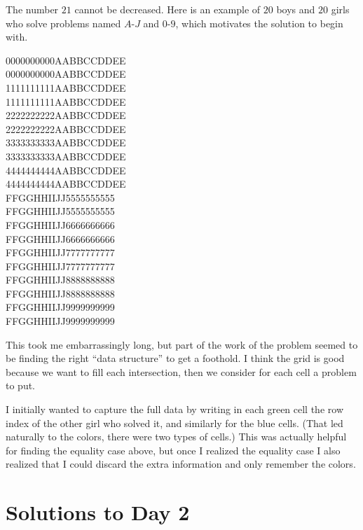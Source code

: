 \begin{remark*}
The number $21$ cannot be decreased.
Here is an example of $20$ boys and $20$ girls
who solve problems named $A$-$J$
and $0$-$9$, which motivates the solution to begin with.
\begin{center}
\scriptsize \ttfamily
{\color{green}0000000000}{\color{blue}AABBCCDDEE} \\
{\color{green}0000000000}{\color{blue}AABBCCDDEE} \\
{\color{green}1111111111}{\color{blue}AABBCCDDEE} \\
{\color{green}1111111111}{\color{blue}AABBCCDDEE} \\
{\color{green}2222222222}{\color{blue}AABBCCDDEE} \\
{\color{green}2222222222}{\color{blue}AABBCCDDEE} \\
{\color{green}3333333333}{\color{blue}AABBCCDDEE} \\
{\color{green}3333333333}{\color{blue}AABBCCDDEE} \\
{\color{green}4444444444}{\color{blue}AABBCCDDEE} \\
{\color{green}4444444444}{\color{blue}AABBCCDDEE} \\
{\color{blue}FFGGHHIIJJ}{\color{green}5555555555} \\
{\color{blue}FFGGHHIIJJ}{\color{green}5555555555} \\
{\color{blue}FFGGHHIIJJ}{\color{green}6666666666} \\
{\color{blue}FFGGHHIIJJ}{\color{green}6666666666} \\
{\color{blue}FFGGHHIIJJ}{\color{green}7777777777} \\
{\color{blue}FFGGHHIIJJ}{\color{green}7777777777} \\
{\color{blue}FFGGHHIIJJ}{\color{green}8888888888} \\
{\color{blue}FFGGHHIIJJ}{\color{green}8888888888} \\
{\color{blue}FFGGHHIIJJ}{\color{green}9999999999} \\
{\color{blue}FFGGHHIIJJ}{\color{green}9999999999}
\end{center}
\end{remark*}

\begin{remark*}
  This took me embarrassingly long,
  but part of the work of the problem seemed to be
  finding the right ``data structure'' to get a foothold.
  I think the grid is good because we want to fill each intersection,
  then we consider for each cell a problem to put.

  I initially wanted to capture the full data by writing
  in each green cell the row index of the other girl who solved it,
  and similarly for the blue cells.
  (That led naturally to the colors, there were two types of cells.)
  This was actually helpful for finding the equality case above,
  but once I realized the equality case
  I also realized that I could discard the extra information
  and only remember the colors.
\end{remark*}
\pagebreak

\section{Solutions to Day 2}